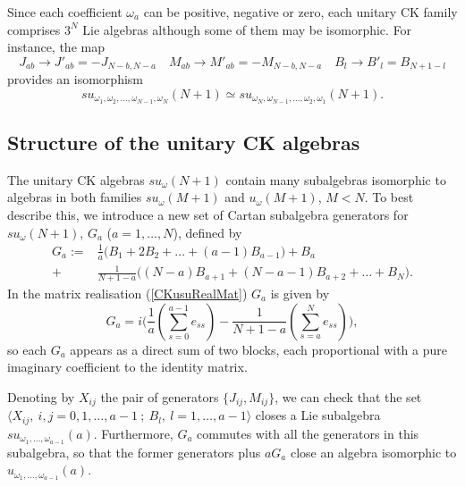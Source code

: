 \documentclass[12pt]{article}
\begin{document}
Since each coefficient ${\omega}_a$ can be positive, negative or zero,
each unitary CK family comprises  $3^N$ Lie algebras  although some of
them may be isomorphic. For instance, the map
\begin{equation}
{J}_{ab}\to {J}'_{ab}=-{J}_{N-b,N-a}  \quad
{M}_{ab}\to {M}'_{ab}=-{M}_{N-b,N-a}  \quad
{B}_{l}\to {B}'_{l}= {B}_{N+1-l}
\label{aga}
\end{equation}
provides an isomorphism
\begin{equation}
su_{{\omega}_1,{\omega}_2,\dots,{\omega}_{N-1},{\omega}_N}(N+1)\simeq
su_{{\omega}_N,{\omega}_{N-1},\dots,{\omega}_2,{\omega}_1}(N+1)  .
\label{PolarityIsom}
\end{equation}

\subsection{Structure of the unitary CK algebras}

The  unitary CK algebras $su_{\omega}(N+1)$ contain many subalgebras
isomorphic to algebras in both families $su_{\omega}(M+1)$ and
$u_{\omega}(M+1)$, $M<N$. To best describe this,  we introduce a new set
of Cartan subalgebra generators for $su_{\omega}(N+1)$,
${G}_a$ ($a=1,\dots,N$), defined by
\begin{equation}
\begin{array}{rl}
{G}_a:= & \displaystyle
\frac{1}{a} \Big( {B}_1+2{B}_2+\dots+(a-1){B}_{a-1}\Big) + B_a
\\
+ &
\displaystyle
\frac{1}{N+1-a} \Big( (N-a){B}_{a+1}+(N-a-1){B}_{a+2}+\dots+{B}_{N}\Big).
\end{array}
\label{Ggenerators}
\end{equation}
In the matrix realisation (\ref{CKusuRealMat}) ${G}_a$ is given by
\begin{equation}
{G}_a=i\Big(\frac{1}{a}(\sum_{s=0}^{a-1}e_{ss})-
           \frac{1}{N+1-a}(\sum_{s=a}^{N}e_{ss})\Big),
\end{equation}
so each ${G}_a$ appears as a direct sum of two blocks,
each proportional with a pure imaginary coefficient to the identity matrix.

Denoting by ${X}_{ij}$ the pair of generators
$\{{J}_{ij},{M}_{ij}\}$, we can check that the set $\langle
{X}_{ij},\ i,j=0,1,\dots,a-1\ ;\ {B}_l,\ l=1,\dots,a-1\rangle$
closes a Lie subalgebra
$su_{{\omega}_1,\dots,{\omega}_{a-1}}(a)$.
Furthermore,
${G}_a$ commutes with all the generators in this subalgebra, so that
the former generators plus $a{G}_a$ close an algebra isomorphic to
$u_{{\omega}_1,\dots,{\omega}_{a-1}}(a)$.
\end{document}
